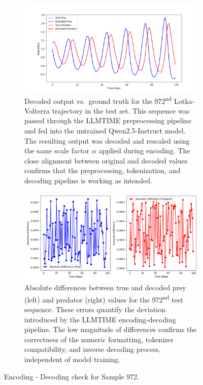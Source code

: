 \documentclass[a4paper,12pt]{article}
\begin{document}
\begin{figure}[H]
  \centering

  \begin{subfigure}[t]{0.95\textwidth}
      \centering
      \includegraphics[width=\textwidth]{true_vs_decoded.png}
      \caption{Decoded output vs.\ ground truth for the 972\textsuperscript{nd} Lotka-Volterra trajectory in the test set. This sequence was passed through the LLMTIME preprocessing pipeline and fed into the untrained Qwen2.5-Instruct model. The resulting output was decoded and rescaled using the same scale factor $\alpha$ applied during encoding. The close alignment between original and decoded values confirms that the preprocessing, tokenization, and decoding pipeline is working as intended.}
      \label{fig:true_vs_decoded}
  \end{subfigure}

  \vspace{0.5cm}

  \begin{subfigure}[t]{0.95\textwidth}
      \centering
      \includegraphics[width=\textwidth]{absolute_differences.png}
      \caption{Absolute differences between true and decoded prey (left) and predator (right) values for the 972\textsuperscript{nd} test sequence. These errors quantify the deviation introduced by the LLMTIME encoding-decoding pipeline. The low magnitude of differences confirms the correctness of the numeric formatting, tokenizer compatibility, and inverse decoding process, independent of model training.}
      \label{fig:absolute_differences}
  \end{subfigure}
  \vspace{0.5cm}
  \caption{ Encoding - Decoding check for Sample 972.}
  \label{fig:decoding_pipeline_evaluation}
\end{figure}
\end{document}
